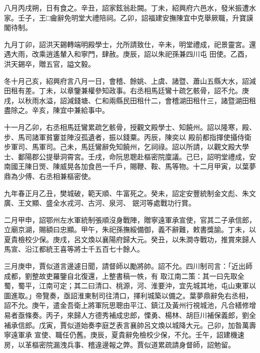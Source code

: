 \begin{pinyinscope}
 八月丙戌朔，日有食之。辛丑，詔家鉉翁赴闕。丁未，紹興府六邑水，發米振遭水家。壬子，王□龠辭免明堂大禮陪祠。乙卯，詔福建安撫陳宜中克舉厥職，升寶謨閣待制。



 九月丁卯，詔洪天錫轉端明殿學士，允所請致仕，辛未，明堂禮成，祀景靈宮。還遇大雨，改乘逍遙輦入和寧門，肆赦。庚辰，詔以朱祀孫兼四川屯
 田使。乙酉，洪天錫卒，贈五官，謚文毅。



 冬十月己亥，紹興府言八月一日，會稽、餘姚、上虞、諸暨、蕭山五縣大水，詔減田租有差。丁未，以章鑒兼權參知政事。右丞相馬廷鸞十疏乞骸骨，詔不允。庚戌，以秋雨水溢，詔減錢塘、仁和兩縣民田租什二，會稽湖田租什三，諸暨湖田租盡除之。辛亥，陳宜中兼給事中。



 十一月乙卯，右丞相馬廷鸞累疏乞骸骨，授觀文殿學士、知饒州。詔以隆寒，殿、步、馬司諸軍貧窶並陣沒孤遺者，振以錢粟。丙辰，陳奕以
 殿前都指揮使攝侍衛步軍司、馬軍司。己未，馬廷鸞辭免知饒州，乞祠祿。詔以所請，以觀文殿大學士、鄱陽郡公提舉洞霄宮。壬戌，命阮思聰赴樞密院廩議。己巳，詔明堂禮成，安南國王陳日煚、陳威晃各加食邑一千戶，賜鞭、鞍、馬等物。十二月甲寅，以葉夢鼎為少傅、右丞相兼樞密使。



 九年春正月乙丑，樊城破，範天順、牛富死之。癸未，詔定安豐統制金文彪、朱文廣、王文顯、盛全水戎河、古河、泉河、
 鈱河等處戰功行賞。



 二月甲申，詔鄂州左水軍統制張順沒身戰陣，贈寧遠軍承宣使，官其二子承信郎，立廟京湖，賜額曰忠顯。甲午，朱祀孫撫綏備御，義不辭難，敕書獎諭。丁未，以夏貴檢校少保。庚戌，呂文煥以襄陽府歸大元。癸丑，以朱澗寺戰功，推賞來歸人馬宣、沿江都統王喜等將士千五百七十餘人。



 三月庚申，賈似道言邊遽日聞，請督師以勵將帥。詔不允。四川制司言：「近出師成都，劉整故吏羅鑒自北復還，上整書稿一帙，有
 取江南二策：其一曰先取全蜀，蜀平，江南可定；其二曰清口、桃源，河、淮要沖，宜先城其地，屯山東軍以圖進取。」帝覽奏，亟詔淮東制司往清口，擇利城築以備之。葉夢鼎辭免右丞相，詔不允。庚午，遣金吾衛上將軍阮思聰由平江、鎮江及黃州行視城池，凡合繕修增易者亟條奏。丙子，來歸人方德秀補成忠郎，慄勇、楊林、胡巨川補保義郎，劉全補承信郎。戊寅，賈似道始奏李庭芝表言襄帥呂文煥以城降大元。己卯，加昝萬壽寧遠軍承
 宣使、職任仍舊。庚辰，夏貴辭免檢校少保，不允。壬午，詔建機速房，以革樞密院漏洩兵事、稽違邊報之弊。賈似道累疏請身督師，詔勉留。




\end{pinyinscope}
